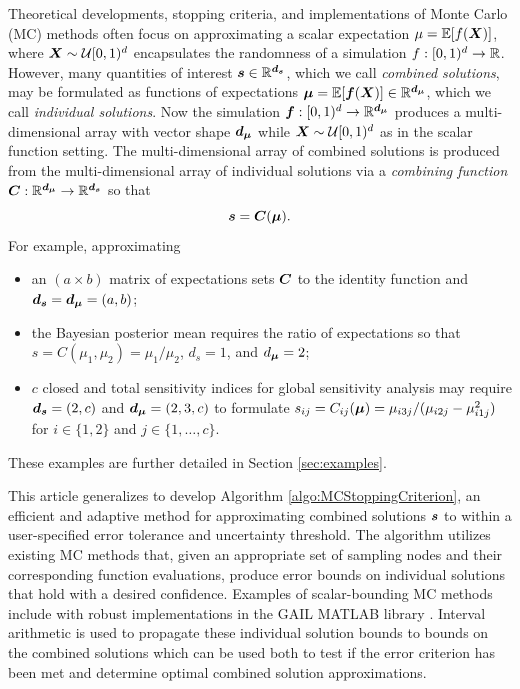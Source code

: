 \documentclass{article}[12pt]
\begin{document}
Theoretical developments, stopping criteria, and implementations of Monte Carlo (MC) methods often focus on approximating a scalar expectation $\mu = \mathbb{E}[f(\boldsymbol{X})]$, where $\boldsymbol{X} \sim \mathcal{U}[0,1)^d$ encapsulates the randomness of a simulation $f: [0,1)^d \to \mathbb{R}$. However, many quantities of interest $\boldsymbol{s} \in \mathbb{R}^{\boldsymbol{d}_{\boldsymbol{s}}}$, which we call \emph{combined solutions}, may be formulated as functions of expectations $\boldsymbol{\mu} = \mathbb{E}[\boldsymbol{f}(\boldsymbol{X})] \in \mathbb{R}^{\boldsymbol{d}_{\boldsymbol{\mu}}}$, which we call \emph{individual solutions}. Now the simulation $\boldsymbol{f}: [0,1)^{d} \to \mathbb{R}^{\boldsymbol{d}_{\boldsymbol{\mu}}}$ produces a multi-dimensional array with vector shape $\boldsymbol{d}_{\boldsymbol{\mu}}$ while $\boldsymbol{X} \sim \mathcal{U}[0,1)^d$ as in the scalar function setting. The multi-dimensional array of combined solutions is produced from the multi-dimensional array of individual solutions via a \emph{combining function} $\boldsymbol{C}: \mathbb{R}^{\boldsymbol{d}_{\boldsymbol{\mu}}} \to \mathbb{R}^{\boldsymbol{d}_{\boldsymbol{s}}}$ so that 
\begin{equation}
    \boldsymbol{s} = \boldsymbol{C}(\boldsymbol{\mu}).
    \label{eq:comb_from_indv}
\end{equation}
For example, approximating
\begin{itemize}
    \item an $(a \times b)$ matrix of expectations sets $\boldsymbol{C}$ to the identity function and $\boldsymbol{d}_{\boldsymbol{s}} = \boldsymbol{d}_{\boldsymbol{\mu}} = (a,b)$;
    \item the Bayesian posterior mean requires the ratio of expectations so that $s = C(\mu_1,\mu_2) = \mu_1/\mu_2$, $d_s = 1$, and $d_{\boldsymbol{\mu}} = 2$;
    \item $c$ closed and total sensitivity indices for global sensitivity analysis may require $\boldsymbol{d}_{\boldsymbol{s}} = (2,c)$ and $\boldsymbol{d}_{\boldsymbol{\mu}} = (2,3,c)$ to formulate $s_{ij} = C_{ij}(\boldsymbol{\mu}) =  \mu_{i3j}/(\mu_{i2j}-\mu_{i1j}^2)$ for $i \in \{1,2\}$ and $j \in \{1,\dots,c\}$.
\end{itemize}
These examples are further detailed in Section \ref{sec:examples}.

This article generalizes \cite{adaptive_qmc} to develop Algorithm \ref{algo:MCStoppingCriterion}, an efficient and adaptive method for approximating combined solutions $\boldsymbol{s}$ to within a user-specified error tolerance and uncertainty threshold. The algorithm utilizes existing MC  methods that, given an appropriate set of sampling nodes and their corresponding function evaluations, produce error bounds on individual solutions that hold with a desired confidence. Examples of scalar-bounding MC methods include \cite{cubmcg,cubqmclattice,cubqmcsobol,cubqmcbayes_thesis,cubqmcbayeslattice} with robust implementations in the GAIL MATLAB library \cite{ChoEtal21a,hickernell2018monte}. Interval arithmetic is used to propagate these individual solution bounds to bounds on the combined solutions which can be used both to test if the error criterion has been met and determine optimal combined solution approximations. 
\end{document}
